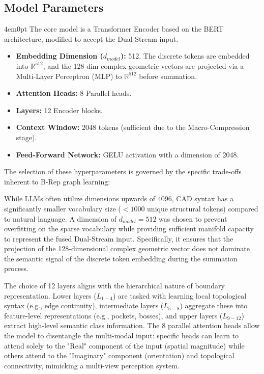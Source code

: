 \subsection{Model Parameters}
	\begin{indentedblock}{4em}{0pt}
		The core model is a Transformer Encoder based on the BERT architecture, modified to accept the Dual-Stream input.
	
		\begin{itemize}
			\item \textbf{Embedding Dimension ($d_{model}$):} 512. The discrete tokens are embedded into $\mathbb{R}^{512}$, and the 128-dim complex geometric vectors are projected via a Multi-Layer Perceptron (MLP) to $\mathbb{R}^{512}$ before summation.
			\item \textbf{Attention Heads:} 8 Parallel heads.
			\item \textbf{Layers:} 12 Encoder blocks.
			\item \textbf{Context Window:} 2048 tokens (sufficient due to the Macro-Compression stage).
			\item \textbf{Feed-Forward Network:} GELU activation with a dimension of 2048.
		\end{itemize}
		
		The selection of these hyperparameters is governed by the specific trade-offs inherent to B-Rep graph learning:
		
		While LLMs often utilize dimensions upwards of 4096, CAD syntax has a significantly smaller vocabulary size ($<1000$ unique structural tokens) compared to natural language. A dimension of $d_{model}=512$ was chosen to prevent overfitting on the sparse vocabulary while providing sufficient manifold capacity to represent the fused Dual-Stream input. Specifically, it ensures that the projection of the 128-dimensional complex geometric vector does not dominate the semantic signal of the discrete token embedding during the summation process.
		
		The choice of 12 layers aligns with the hierarchical nature of boundary representation. Lower layers ($L_{1-4}$) are tasked with learning local topological syntax (e.g., edge continuity), intermediate layers ($L_{5-8}$) aggregate these into feature-level representations (e.g., pockets, bosses), and upper layers ($L_{9-12}$) extract high-level semantic class information. The 8 parallel attention heads allow the model to disentangle the multi-modal input: specific heads can learn to attend solely to the "Real" component of the input (spatial magnitude) while others attend to the "Imaginary" component (orientation) and topological connectivity, mimicking a multi-view perception system.
		

\end{indentedblock}

